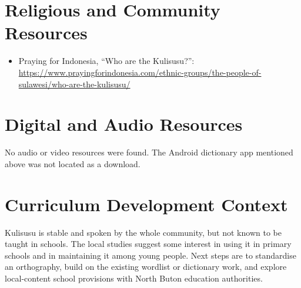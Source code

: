 \documentclass[12pt]{article}
\begin{document}
\section{Religious and Community Resources}
\begin{itemize}
\item Praying for Indonesia, ``Who are the Kulisusu?'': \url{https://www.prayingforindonesia.com/ethnic-groups/the-people-of-sulawesi/who-are-the-kulisusu/}
\end{itemize}

\section{Digital and Audio Resources}
No audio or video resources were found. The Android dictionary app mentioned above was not located as a download.

\section{Curriculum Development Context}
Kulisusu is stable and spoken by the whole community, but not known to be taught in schools. The local studies suggest some interest in using it in primary schools and in maintaining it among young people. Next steps are to standardise an orthography, build on the existing wordlist or dictionary work, and explore local-content school provisions with North Buton education authorities.
\end{document}
